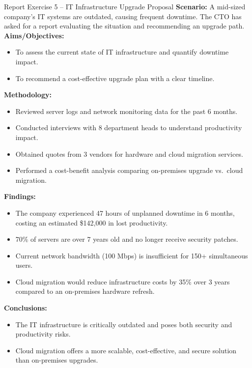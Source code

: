 \documentclass[12pt,a4paper]{article}
\begin{document}
\begin{exbox}{Report Exercise 5 -- IT Infrastructure Upgrade Proposal}
\textbf{Scenario:} A mid-sized company's IT systems are outdated, causing frequent downtime. The CTO has asked for a report evaluating the situation and recommending an upgrade path.\\[0.3cm]

\textbf{Aims/Objectives:}
\begin{itemize}[noitemsep]
    \item To assess the current state of IT infrastructure and quantify downtime impact.
    \item To recommend a cost-effective upgrade plan with a clear timeline.
\end{itemize}

\textbf{Methodology:}
\begin{itemize}[noitemsep]
    \item Reviewed server logs and network monitoring data for the past 6 months.
    \item Conducted interviews with 8 department heads to understand productivity impact.
    \item Obtained quotes from 3 vendors for hardware and cloud migration services.
    \item Performed a cost-benefit analysis comparing on-premises upgrade vs.\ cloud migration.
\end{itemize}

\textbf{Findings:}
\begin{itemize}[noitemsep]
    \item The company experienced 47 hours of unplanned downtime in 6 months, costing an estimated \$142,000 in lost productivity.
    \item 70\% of servers are over 7 years old and no longer receive security patches.
    \item Current network bandwidth (100 Mbps) is insufficient for 150+ simultaneous users.
    \item Cloud migration would reduce infrastructure costs by 35\% over 3 years compared to an on-premises hardware refresh.
\end{itemize}

\textbf{Conclusions:}
\begin{itemize}[noitemsep]
    \item The IT infrastructure is critically outdated and poses both security and productivity risks.
    \item Cloud migration offers a more scalable, cost-effective, and secure solution than on-premises upgrades.
\end{itemize}


\end{exbox}
\end{document}

